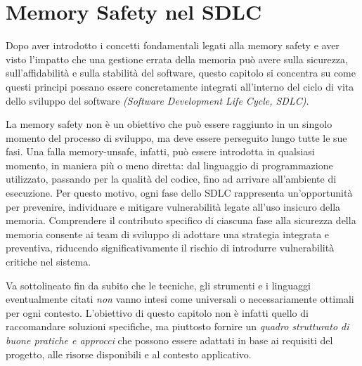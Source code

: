 \chapter{Memory Safety nel SDLC}
\label{cha:sdlc}

Dopo aver introdotto i concetti fondamentali legati alla memory safety e aver
visto l'impatto che una gestione errata della memoria può avere sulla sicurezza,
sull'affidabilità e sulla stabilità del software, questo capitolo si concentra
su come questi principi possano essere concretamente integrati all'interno del
ciclo di vita dello sviluppo del software \textit{(Software Development Life Cycle,
SDLC)}.

La memory safety non è un obiettivo che può essere raggiunto in un singolo momento
del processo di sviluppo, ma deve essere perseguito lungo tutte le sue fasi. Una
falla memory-unsafe, infatti, può essere introdotta in qualsiasi momento, in
maniera più o meno diretta: dal linguaggio di programmazione utilizzato,
passando per la qualità del codice, fino ad arrivare all'ambiente di esecuzione.
Per questo motivo, ogni fase dello SDLC rappresenta un'opportunità per prevenire,
individuare e mitigare vulnerabilità legate all'uso insicuro della memoria. Comprendere
il contributo specifico di ciascuna fase alla sicurezza della memoria consente ai
team di sviluppo di adottare una strategia integrata e preventiva, riducendo
significativamente il rischio di introdurre vulnerabilità critiche nel sistema.

Va sottolineato fin da subito che le tecniche, gli strumenti e i linguaggi eventualmente
citati \textit{non} vanno intesi come universali o necessariamente ottimali per
ogni contesto. L'obiettivo di questo capitolo non è infatti quello di raccomandare
soluzioni specifiche, ma piuttosto fornire un \textit{quadro strutturato di
buone pratiche e approcci} che possono essere adattati in base ai requisiti del progetto,
alle risorse disponibili e al contesto applicativo.





